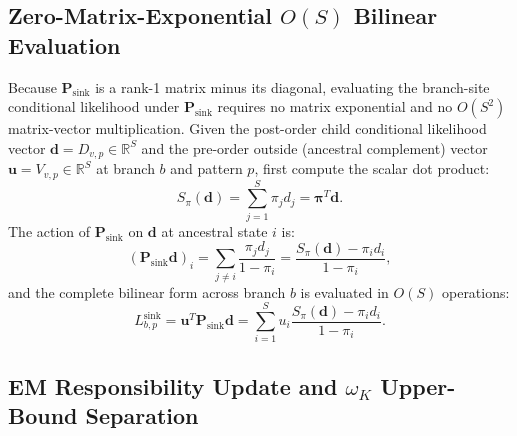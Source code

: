 \documentclass[11pt]{article}
\begin{document}
\subsection{Zero-Matrix-Exponential $O(S)$ Bilinear Evaluation}

Because $\bm{P}_{\text{sink}}$ is a rank-1 matrix minus its diagonal, evaluating the branch-site conditional likelihood under $\bm{P}_{\text{sink}}$ requires no matrix exponential and no $O(S^2)$ matrix-vector multiplication. Given the post-order child conditional likelihood vector $\bm{d} = D_{v,p} \in \mathbb{R}^S$ and the pre-order outside (ancestral complement) vector $\bm{u} = V_{v,p} \in \mathbb{R}^S$ at branch $b$ and pattern $p$, first compute the scalar dot product:
\begin{equation}
    S_{\pi}(\bm{d}) = \sum_{j=1}^S \pi_j d_j = \bm{\pi}^T \bm{d}.
\end{equation}
The action of $\bm{P}_{\text{sink}}$ on $\bm{d}$ at ancestral state $i$ is:
\begin{equation}
    (\bm{P}_{\text{sink}} \bm{d})_i = \sum_{j \neq i} \frac{\pi_j d_j}{1 - \pi_i} = \frac{S_{\pi}(\bm{d}) - \pi_i d_i}{1 - \pi_i},
\end{equation}
and the complete bilinear form across branch $b$ is evaluated in $O(S)$ operations:
\begin{equation}
    L_{b,p}^{\text{sink}} = \bm{u}^T \bm{P}_{\text{sink}} \bm{d} = \sum_{i=1}^S u_i \frac{S_{\pi}(\bm{d}) - \pi_i d_i}{1 - \pi_i}.
    \label{eq:bilinear}
\end{equation}

\subsection{EM Responsibility Update and $\omega_K$ Upper-Bound Separation}
\end{document}

